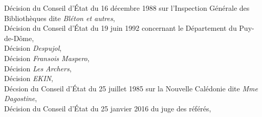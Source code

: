 \documentclass[math]{cours}
\begin{document}
\begin{thebibliography}{255}
	\url{}
	Décision du Conseil d'État du 16 décembre 1988 sur l'Inspection Générale des Bibliothèques dite \emph{Bléton et autres},\\
	\url{}
	Décision du Conseil d'État du 19 juin 1992 concernant le Département du Puy-de-Dôme,\\
	\url{}
	Décision \emph{Despujol},\\
	\url{}
	Décision \emph{Fransois Maspero},\\
	\url{}
	Décision \emph{Les Archers},\\
	\url{}
	Décision \emph{EKIN},\\
	\url{}
	Décsion du Conseil d'État du 25 juillet 1985 sur la Nouvelle Calédonie dite \emph{Mme Dagostine},\\
	\url{}
	Décision du Conseil d'État du 25 janvier 2016 du juge des référés,\\
	\url{}
\end{thebibliography}
\newpage
{}

\end{document}
